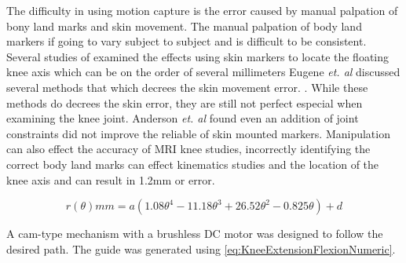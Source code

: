 The difficulty in using motion capture is the error caused by manual palpation of bony land marks and skin movement. The manual palpation of body land markers if going to vary subject to subject and is difficult to  be consistent. Several studies of examined the effects using skin markers to locate the floating knee axis which can be on the order of several millimeters Eugene \textit{et. al} discussed several methods that which decrees the skin movement error. \cite{alexander2001correcting} \cite{cappozzo1996position}. While these methods do decrees the skin error, they are still not perfect especial when examining the knee joint.  Anderson \textit{et. al} found even an addition of joint constraints did not improve the reliable of skin mounted markers. Manipulation can also effect the accuracy of MRI knee studies, incorrectly identifying the correct body land marks can effect kinematics studies and the location of the knee axis \cite{lerner2003use} and can result in 1.2mm or error. 


\begin{equation}
    r(\theta) mm = a(1.08\theta^4 - 11.18\theta^3 + 26.52\theta^2 - 0.825\theta) + d
    \label{eq:KneeExtensionFlexionNumeric}
\end{equation}







A cam-type mechanism with a brushless DC motor was designed to follow the desired path. The guide was generated using \autoref{eq:KneeExtensionFlexionNumeric}. 


